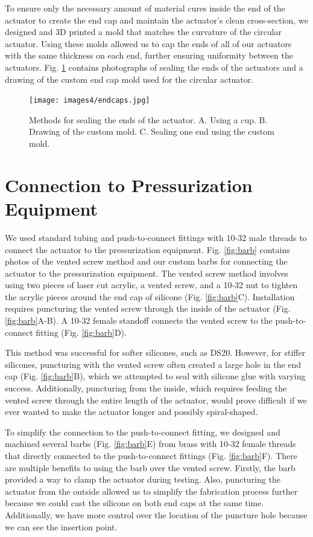 To ensure only the necessary amount of material cures inside the end of the actuator to create the end cap and maintain the actuator's clean cross-section, we designed and 3D printed a mold that matches the curvature of the circular actuator. Using these molds allowed us to cap the ends of all of our actuators with the same thickness on each end, further ensuring uniformity between the actuators. Fig. \ref{fig:endcaps} contains photographs of sealing the ends of the actuators and a drawing of the custom end cap mold used for the circular actuator. 

\begin{figure}[ht!]
    \centering
    \texttt{[image: images4/endcaps.jpg]}
    \caption{Methods for sealing the ends of the actuator. A. Using a cup. B. Drawing of the custom mold. C. Sealing one end using the custom mold.}
    \label{fig:endcaps}
\end{figure}

\clearpage
\section{Connection to Pressurization Equipment}

We used standard tubing and push-to-connect fittings with 10-32 male threads to connect the actuator to the pressurization equipment. Fig. \ref{fig:barb} contains photos of the vented screw method and our custom barbs for connecting the actuator to the pressurization equipment. The vented screw method \cite{polygerinos_modeling_2015} involves using two pieces of laser cut acrylic, a vented screw, and a 10-32 nut to tighten the acrylic pieces around the end cap of silicone (Fig. \ref{fig:barb}C). Installation requires puncturing the vented screw through the inside of the actuator (Fig. \ref{fig:barb}A-B). A 10-32 female standoff connects the vented screw to the push-to-connect fitting (Fig. \ref{fig:barb}D). 

This method was successful for softer silicones, such as DS20. However, for stiffer silicones, puncturing with the vented screw often created a large hole in the end cap (Fig. \ref{fig:barb}B), which we attempted to seal with silicone glue with varying success. Additionally, puncturing from the inside, which requires feeding the vented screw through the entire length of the actuator, would prove difficult if we ever wanted to make the actuator longer and possibly spiral-shaped. 

To simplify the connection to the push-to-connect fitting, we designed and machined several barbs (Fig. \ref{fig:barb}E) from brass with 10-32 female threads that directly connected to the push-to-connect fittings (Fig. \ref{fig:barb}F). There are multiple benefits to using the barb over the vented screw. Firstly, the barb provided a way to clamp the actuator during testing. Also, puncturing the actuator from the outside allowed us to simplify the fabrication process further because we could cast the silicone on both end caps at the same time. Additionally, we have more control over the location of the puncture hole because we can see the insertion point. 

